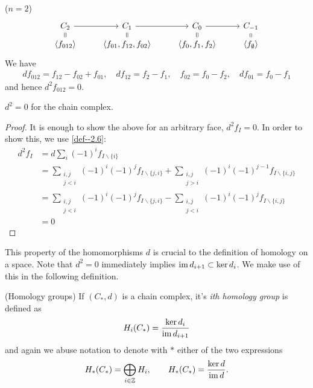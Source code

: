\documentclass[a4paper,11pt]{article}
\begin{document}
			\begin{eg}($n=2$)
				\begin{equation*}
					\begin{tikzcd}[row sep=tiny]
					C_2\ar[d,equal]\arrow[r]& C_1\ar[d,equal]\arrow[r]& C_0\ar[d,equal]\arrow[r]& C_{-1}\ar[d,equal]
					\\
					\langle f_{012}\rangle& \langle f_{01},f_{12},f_{02}\rangle& \langle f_{0},f_1,f_2\rangle& \langle f_{\emptyset}\rangle 
					\end{tikzcd}
				\end{equation*}
				We have \begin{align*}
					df_{012}=f_{12}-f_{02}+f_{01},\quad
					df_{12}=f_{2}-f_{1},\quad f_{02}=f_{0}-f_{2},\quad df_{01}=f_{0}-f_{1}
				\end{align*}
				and hence $d^2f_{012}=0$.
			\end{eg}

			\begin{prop}
				$d^2=0$ for the chain complex.
			\end{prop}
			\begin{proof}
				It is enough to show the above for an arbitrary face, $d^2f_I=0$. In order to show this, we use \autoref{def--2.6}:
				\begin{align}
					d^2f_I&=d\sum_i(-1)^i f_{I\backslash\{i\}}\\
					&=\sum_{\substack{i,j\\j<i}}(-1)^i(-1)^jf_{I\backslash\{j,i\}}+\sum_{\substack{i,j\\j>i}}(-1)^i(-1)^{j-1}f_{I\backslash\{i,j\}}\\
					&=\sum_{\substack{i,j\\j<i}}(-1)^i(-1)^jf_{I\backslash\{j,i\}}-\sum_{\substack{i,j\\j<i}}(-1)^i(-1)^{j}f_{I\backslash\{i,j\}}\\
					&=0
				\end{align}
			\end{proof}
			This property of the homomorphisms $d$ is crucial to the definition of homology on a space. Note that $d^2=0$ immediately implies $\operatorname{im} d_{i+1}\subset\ker d_{i}$. We make use of this in the following definition.

			\begin{defi}(Homology groups)
				If $(C_\ast,d)$ is a chain complex, it's \textit{ith homology group} is defined as \begin{equation*}
					H_{i}(C_{\ast})=\frac{\ker d_{i}}{\operatorname{im} d_{i+1}}
				\end{equation*}
				and again we abuse notation to denote with $\ast$ either of the two expressions
				\begin{equation*}
					H_{\ast}(C_{\ast})=\bigoplus_{i\in\mathbb{Z}}H_{i},\qquad H_{\ast}(C_{\ast})=\frac{\ker d}{\operatorname{im} d}.
				\end{equation*}
			\end{defi}
\end{document}
